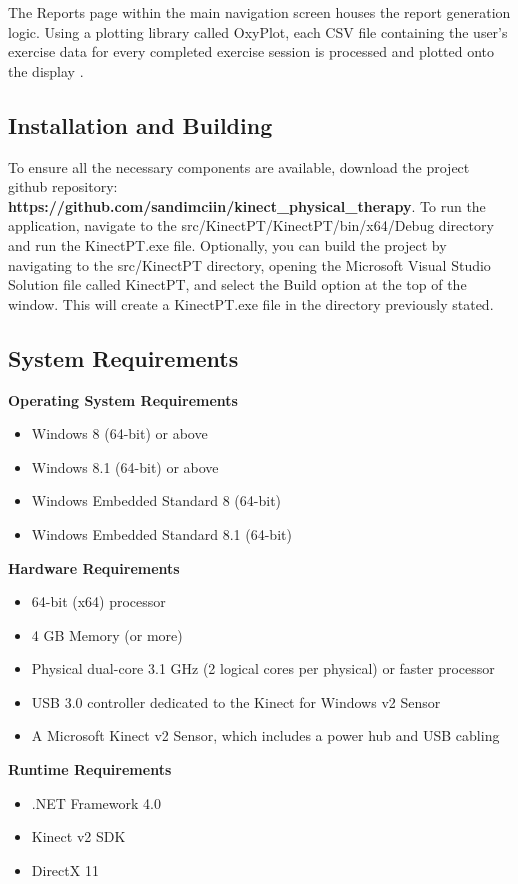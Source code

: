 \documentclass[onecolumn, draftclsnofoot,10pt, compsoc]{IEEEtran}
\begin{document}
The Reports page within the main navigation screen houses the report generation logic. Using a plotting library called OxyPlot, each CSV file containing the user's exercise data for every completed exercise session is processed and plotted onto the display \cite{Vitruvius, KinectDevelop, csvFile}.

\subsection{Installation and Building}
To ensure all the necessary components are available, download the project github repository: \textbf{https://github.com/sandimciin/kinect_physical_therapy}. To run the application, navigate to the src/KinectPT/KinectPT/bin/x64/Debug directory and run the KinectPT.exe file. Optionally, you can build the project by navigating to the src/KinectPT directory, opening the Microsoft Visual Studio Solution file called KinectPT, and select the Build option at the top of the window. This will create a KinectPT.exe file in the directory previously stated.

\subsection{System Requirements}
\textbf{Operating System Requirements}
\begin{itemize}
    \item Windows 8 (64-bit) or above
    \item Windows 8.1 (64-bit) or above
    \item Windows Embedded Standard 8 (64-bit)
    \item Windows Embedded Standard 8.1 (64-bit) \cite{KinectConstraints}
\end{itemize}
\textbf{Hardware Requirements}
\begin{itemize}
    \item 64-bit (x64) processor
    \item 4 GB Memory (or more)
    \item Physical dual-core 3.1  GHz (2 logical cores per physical) or faster processor
    \item USB 3.0 controller dedicated to the Kinect for Windows v2 Sensor
    \item A Microsoft Kinect v2 Sensor, which includes a power hub and USB cabling \cite{KinectDevelop,KinectConstraints}
\end{itemize}
\textbf{Runtime Requirements}
\begin{itemize}
    \item .NET Framework 4.0
    \item Kinect v2 SDK
    \item DirectX 11
\end{itemize}
\end{document}
